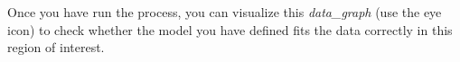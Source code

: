 

Once you have run the process, you can visualize this \textit{data\_graph} (use the eye icon) to check whether the model you have defined fits the data correctly in this region of interest.
